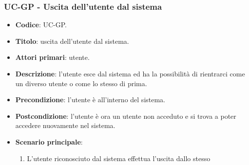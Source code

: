 \subsubsection{UC\theuccount-GP - Uscita dell'utente dal sistema}
	\begin{itemize}
		\item \textbf{Codice}: UC\theuccount-GP.
		\item \textbf{Titolo}: uscita dell'utente dal sistema.
		\item \textbf{Attori primari}: utente.
		\item \textbf{Descrizione}: l'utente esce dal sistema ed ha la possibilità di rientrarci come	un diverso utente o come lo stesso di prima.
		\item \textbf{Precondizione}: l'utente è all'interno del sistema.
		\item \textbf{Postcondizione}: l'utente è ora un utente non acceduto e si trova a poter accedere nuovamente nel sistema.
		\item \textbf{Scenario principale}:
		\begin{enumerate}
			\item L'utente riconosciuto dal sistema effettua l'uscita dallo stesso
		\end{enumerate}
	\end{itemize}